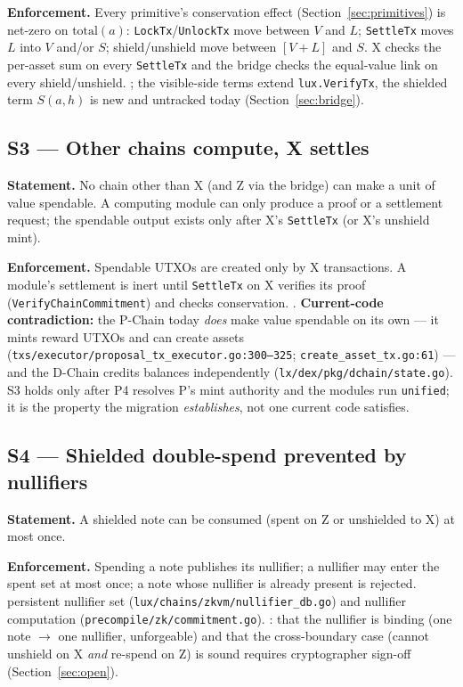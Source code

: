 \textbf{Enforcement.} Every primitive's conservation effect
(Section~\ref{sec:primitives}) is net-zero on $\mathrm{total}(a)$:
\texttt{LockTx}/\texttt{UnlockTx} move between $V$ and $L$;
\texttt{SettleTx} moves $L$ into $V$ and/or $S$; shield/unshield move
between $[V{+}L]$ and $S$. X checks the per-asset sum on every
\texttt{SettleTx} and the bridge checks the equal-value link on every
shield/unshield. \DESIGN{}; the visible-side terms extend \IMPL{}
\texttt{lux.VerifyTx}, the shielded term $S(a,h)$ is new and untracked
today (Section~\ref{sec:bridge}).

\subsection*{S3 --- Other chains compute, X settles}

\textbf{Statement.} No chain other than X (and Z via the bridge) can
make a unit of value spendable. A computing module can only produce a
proof or a settlement request; the spendable output exists only after
X's \texttt{SettleTx} (or X's unshield mint).

\textbf{Enforcement.} Spendable UTXOs are created only by X transactions.
A module's settlement is inert until \texttt{SettleTx} on X verifies its
proof (\texttt{VerifyChainCommitment}) and checks conservation. \DESIGN{}.
\textbf{Current-code contradiction:} the P-Chain today \emph{does} make
value spendable on its own --- it mints reward UTXOs and can create
assets (\texttt{txs/executor/proposal\_tx\_executor.go:300--325};
\texttt{create\_asset\_tx.go:61}) --- and the D-Chain credits balances
independently (\texttt{lx/dex/pkg/dchain/state.go}). S3 holds only after
P4 resolves P's mint authority and the modules run \texttt{unified}; it
is the property the migration \emph{establishes}, not one current code
satisfies.

\subsection*{S4 --- Shielded double-spend prevented by nullifiers}

\textbf{Statement.} A shielded note can be consumed (spent on Z or
unshielded to X) at most once.

\textbf{Enforcement.} Spending a note publishes its nullifier; a
nullifier may enter the spent set at most once; a note whose nullifier
is already present is rejected. \IMPL{} persistent nullifier set
(\texttt{lux/chains/zkvm/nullifier\_db.go}) and nullifier computation
(\texttt{precompile/zk/commitment.go}). \textbf{\CRYPTO{}}: that the
nullifier is binding (one note $\to$ one nullifier, unforgeable) and
that the cross-boundary case (cannot unshield on X \emph{and} re-spend
on Z) is sound requires cryptographer sign-off
(Section~\ref{sec:open}).

